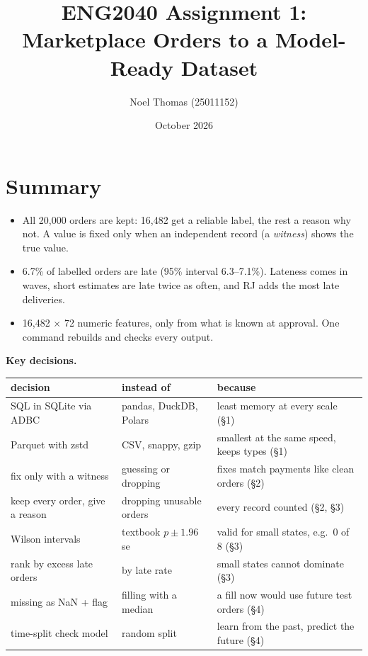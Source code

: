 \documentclass[11pt,a4paper]{article}
\title{\vspace{-1.5cm}ENG2040 Assignment 1: Marketplace Orders to a Model-Ready Dataset}
\author{Noel Thomas (25011152)}
\date{October 2026}
\begin{document}
\maketitle
\vspace{-1cm}
{\small\tableofcontents}

\section*{Summary}
\begin{itemize}
  \item All 20,000 orders are kept: 16,482 get a reliable label, the rest a reason why not. A value is fixed only when an independent record (a \emph{witness}) shows the true value.
  \item 6.7\% of labelled orders are late (95\% interval 6.3--7.1\%). Lateness comes in waves, short estimates are late twice as often, and RJ adds the most late deliveries.
  \item 16,482 $\times$ 72 numeric features, only from what is known at approval. One command rebuilds and checks every output.
\end{itemize}

\textbf{Key decisions.}
\begin{center}\small
\begin{tabular}{lll}
\toprule
decision & instead of & because \\
\midrule
SQL in SQLite via ADBC & pandas, DuckDB, Polars & least memory at every scale (\S1) \\
Parquet with zstd & CSV, snappy, gzip & smallest at the same speed, keeps types (\S1) \\
fix only with a witness & guessing or dropping & fixes match payments like clean orders (\S2) \\
keep every order, give a reason & dropping unusable orders & every record counted (\S2, \S3) \\
Wilson intervals & textbook $p \pm 1.96\,$se & valid for small states, e.g.\ 0 of 8 (\S3) \\
rank by excess late orders & by late rate & small states cannot dominate (\S3) \\
missing as NaN + flag & filling with a median & a fill now would use future test orders (\S4) \\
time-split check model & random split & learn from the past, predict the future (\S4) \\
\bottomrule
\end{tabular}
\end{center}
\end{document}

